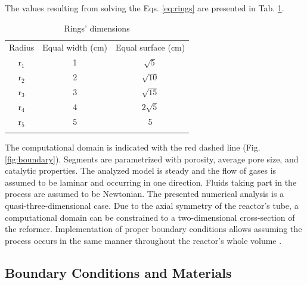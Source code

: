 \documentclass[preprint,12pt]{elsarticle}
\begin{document}
The values resulting from solving the Eqs. \eqref{eq:rings} are presented in Tab. \ref{tab:rings_radius}.  


\begin{table}[h]
\centering
\caption{Rings' dimensions}
\label{tab:rings_radius}
\begin{tabular}{c||c|c}
\hline\noalign{\smallskip}
Radius & Equal width (cm) & Equal surface (cm) \\
\noalign{\smallskip}\hline\noalign{\smallskip}
r$_1$ & 1 & $\sqrt{5}$ \\
\noalign{\smallskip}\hline\noalign{\smallskip}
r$_2$ & 2 & $\sqrt{10}$  \\
\noalign{\smallskip}\hline\noalign{\smallskip}
r$_3$ & 3 & $\sqrt{15}$  \\
\noalign{\smallskip}\hline\noalign{\smallskip}
r$_4$ & 4 & $2\sqrt{5}$ \\
\noalign{\smallskip}\hline\noalign{\smallskip}
r$_5$ & 5 & 5 \\
\noalign{\smallskip}\hline
\end{tabular}

\end{table}

The computational domain is indicated with the red dashed line (Fig. \ref{fig:boundary}). Segments are parametrized with porosity, average pore size, and catalytic properties. The analyzed model is steady and the flow of gases is assumed to be laminar and occurring in one direction. Fluids taking part in the process are assumed to be Newtonian. The presented numerical analysis is a quasi-three-dimensional case. Due to the axial symmetry of the reactor's tube, a computational domain can be constrained to a two-dimensional cross-section of the reformer. Implementation of proper boundary conditions allows assuming the process occurs in the same manner throughout the reactor's whole volume \cite{Patankar1980}. 

\subsection{Boundary Conditions and Materials}
\label{sec:boundary}
\end{document}
